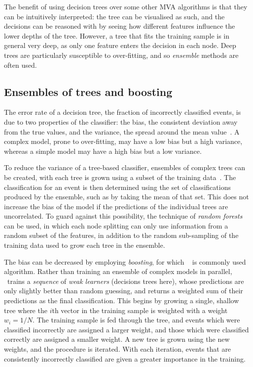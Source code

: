 The benefit of using decision trees over some other \ac{MVA} algorithms is that 
they can be intuitively interpreted: the tree can be visualised as such, and 
the decisions can be reasoned with by seeing how different features influence 
the lower depths of the tree.
However, a tree that fits the training sample is in general very deep, as only 
one feature enters the decision in each node.
Deep trees are particularly susceptible to over-fitting, and so \emph{ensemble} 
methods are often used.

\subsection{Ensembles of trees and boosting}
\label{chap:cpv:kinematic_weighting:bdt_theory:ensembles}

The error rate of a decision tree, the fraction of incorrectly classified 
events, is due to two properties of the classifier: the bias, the consistent 
deviation away from the true values, and the variance, the spread around the 
mean value~\cite{Breiman96biasvariance}.
A complex model, prone to over-fitting, may have a low bias but a high 
variance, whereas a simple model may have a high bias but a low variance.

To reduce the variance of a tree-based classifier, ensembles of complex trees 
can be created, with each tree is grown using a subset of the training 
data~\cite{Breiman1996}.
The classification for an event is then determined using the set of 
classifications produced by the ensemble, such as by taking the mean of that 
set.
This does not increase the bias of the model if the predictions of the 
individual trees are uncorrelated.
To guard against this possibility, the technique of \emph{random 
  forests}~\cite{Breiman2001,Louppe:14077502} can be used, in which each node 
splitting can only use information from a random subset of the features, in 
addition to the random sub-sampling of the training data used to grow each tree 
in the ensemble.

The bias can be decreased by employing \emph{boosting}, for which 
\adaboost~\cite{Freund1997119} is commonly used algorithm.
Rather than training an ensemble of complex models in parallel, \adaboost\ 
trains a \emph{sequence} of \emph{weak learners} (decisions trees here), whose 
predictions are only slightly better than random guessing, and returns a 
weighted sum of their predictions as the final classification.
This begins by growing a single, shallow tree where the $i$th vector in the 
training sample is weighted with a weight $w_{i} = 1/N$.
The training sample is fed through the tree, and events which were classified 
incorrectly are assigned a larger weight, and those which were classified 
correctly are assigned a smaller weight.
A new tree is grown using the new weights, and the procedure is iterated.
With each iteration, events that are consistently incorrectly classified are 
given a greater importance in the training.

